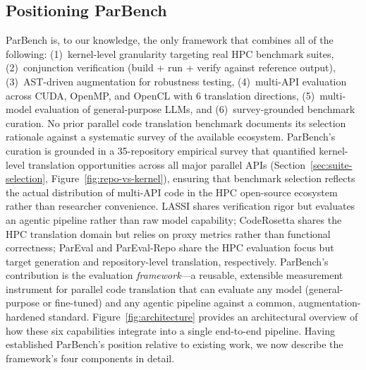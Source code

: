 \documentclass[conference]{IEEEtran}
\begin{document}
\subsection{Positioning ParBench}
\label{sec:positioning}

ParBench is, to our knowledge, the only framework that combines all of the following: (1)~kernel-level granularity targeting real HPC benchmark suites, (2)~conjunction verification (build + run + verify against reference output), (3)~AST-driven augmentation for robustness testing, (4)~multi-API evaluation across CUDA, OpenMP, and OpenCL with 6 translation directions, (5)~multi-model evaluation of general-purpose LLMs, and (6)~survey-grounded benchmark curation. No prior parallel code translation benchmark documents its selection rationale against a systematic survey of the available ecosystem. ParBench's curation is grounded in a 35-repository empirical survey that quantified kernel-level translation opportunities across all major parallel APIs (Section~\ref{sec:suite-selection}, Figure~\ref{fig:repo-vs-kernel}), ensuring that benchmark selection reflects the actual distribution of multi-API code in the HPC open-source ecosystem rather than researcher convenience. LASSI shares verification rigor but evaluates an agentic pipeline rather than raw model capability; CodeRosetta shares the HPC translation domain but relies on proxy metrics rather than functional correctness; ParEval and ParEval-Repo share the HPC evaluation focus but target generation and repository-level translation, respectively. ParBench's contribution is the evaluation \emph{framework}---a reusable, extensible measurement instrument for parallel code translation that can evaluate any model (general-purpose or fine-tuned) and any agentic pipeline against a common, augmentation-hardened standard. Figure~\ref{fig:architecture} provides an architectural overview of how these six capabilities integrate into a single end-to-end pipeline. Having established ParBench's position relative to existing work, we now describe the framework's four components in detail.

\end{document}
